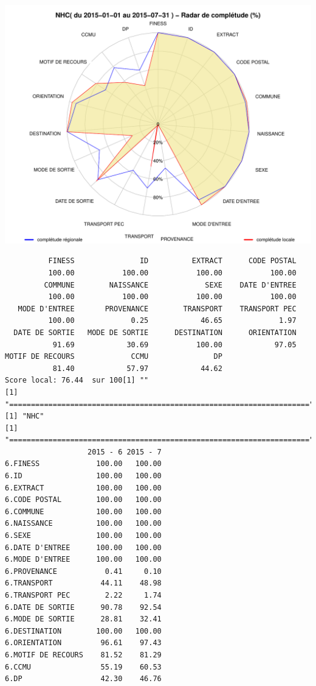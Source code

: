 \documentclass[]{article}
\begin{document}
\includegraphics{completude_files/figure-latex/finess-16.pdf}

\begin{verbatim}
          FINESS               ID          EXTRACT      CODE POSTAL 
          100.00           100.00           100.00           100.00 
         COMMUNE        NAISSANCE             SEXE    DATE D'ENTREE 
          100.00           100.00           100.00           100.00 
   MODE D'ENTREE       PROVENANCE        TRANSPORT    TRANSPORT PEC 
          100.00             0.25            46.65             1.97 
  DATE DE SORTIE   MODE DE SORTIE      DESTINATION      ORIENTATION 
           91.69            30.69           100.00            97.05 
MOTIF DE RECOURS             CCMU               DP 
           81.40            57.97            44.62 
Score local: 76.44  sur 100[1] ""
[1] "====================================================================="
[1] "NHC"
[1] "====================================================================="
                   2015 - 6 2015 - 7
6.FINESS             100.00   100.00
6.ID                 100.00   100.00
6.EXTRACT            100.00   100.00
6.CODE POSTAL        100.00   100.00
6.COMMUNE            100.00   100.00
6.NAISSANCE          100.00   100.00
6.SEXE               100.00   100.00
6.DATE D'ENTREE      100.00   100.00
6.MODE D'ENTREE      100.00   100.00
6.PROVENANCE           0.41     0.10
6.TRANSPORT           44.11    48.98
6.TRANSPORT PEC        2.22     1.74
6.DATE DE SORTIE      90.78    92.54
6.MODE DE SORTIE      28.81    32.41
6.DESTINATION        100.00   100.00
6.ORIENTATION         96.61    97.43
6.MOTIF DE RECOURS    81.52    81.29
6.CCMU                55.19    60.53
6.DP                  42.30    46.76
\end{verbatim}
\end{document}
